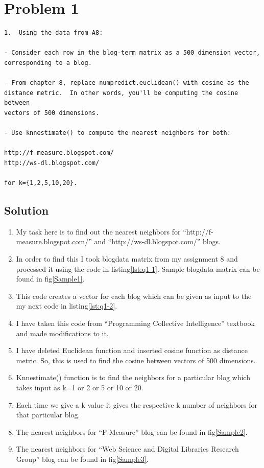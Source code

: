 
\section{Problem 1}
\label{part1}
\begin{verbatim}
1.  Using the data from A8:

- Consider each row in the blog-term matrix as a 500 dimension vector, 
corresponding to a blog.  

- From chapter 8, replace numpredict.euclidean() with cosine as the 
distance metric.  In other words, you'll be computing the cosine between
vectors of 500 dimensions.  

- Use knnestimate() to compute the nearest neighbors for both:

http://f-measure.blogspot.com/
http://ws-dl.blogspot.com/

for k={1,2,5,10,20}.
\end{verbatim}

\subsection{Solution}

\begin{enumerate}
\item My task here is to find out the nearest neighbors for ``http://f-measure.blogspot.com/'' and ``http://ws-dl.blogspot.com/'' blogs.
\item In order to find this I took blogdata matrix from my assignment 8 and processed it using the code in listing\ref{lst:q1-1}. Sample blogdata matrix can be found in fig\ref{Sample1}.
\item This code creates a vector for each blog which can be given as input to the my next code in listing\ref{lst:q1-2}.
\item I have taken this code from ``Programming Collective Intelligence'' textbook and made modifications to it.
\item I have deleted Euclidean function and inserted cosine function as distance metric. So, this is used to find the cosine between vectors of 500 dimensions.
\item Knnestimate() function is to find the neighbors for a particular blog which takes input as k=1 or 2 or 5 or 10 or 20.
\item Each time we give a k value it gives the respective k number of neighbors for that particular blog.
\item The nearest neighbors for ``F-Measure'' blog can be found in fig\ref{Sample2}.
\item The nearest neighbors for ``Web Science and Digital Libraries Research Group'' blog can be found in fig\ref{Sample3}.
\end{enumerate}
\newpage


